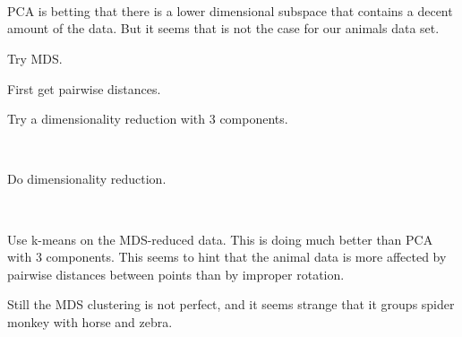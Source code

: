 \documentclass{article} %
\begin{document}
    \begin{center}
    \end{center}
    { \hspace*{\fill} \\}

    \begin{center}
    \end{center}
    { \hspace*{\fill} \\}

    \begin{center}
    \end{center}
    { \hspace*{\fill} \\}

PCA is betting that there is a lower dimensional subspace that contains a decent amount of the data. But it seems that is not the case for our animals data set.

Try MDS.

First get pairwise distances.

Try a dimensionality reduction with 3 components.


    \begin{center}
    \end{center}
    { \hspace*{\fill} \\}


Do dimensionality reduction. 

    \begin{center}
    \end{center}
    { \hspace*{\fill} \\}

Use k-means on the MDS-reduced data. This is doing much better than PCA with 3 components. This seems to hint that the animal data is more affected by pairwise distances between points than by improper rotation.

Still the MDS clustering is not perfect, and it seems strange that it groups spider monkey with horse and zebra. 
 
\end{document}
